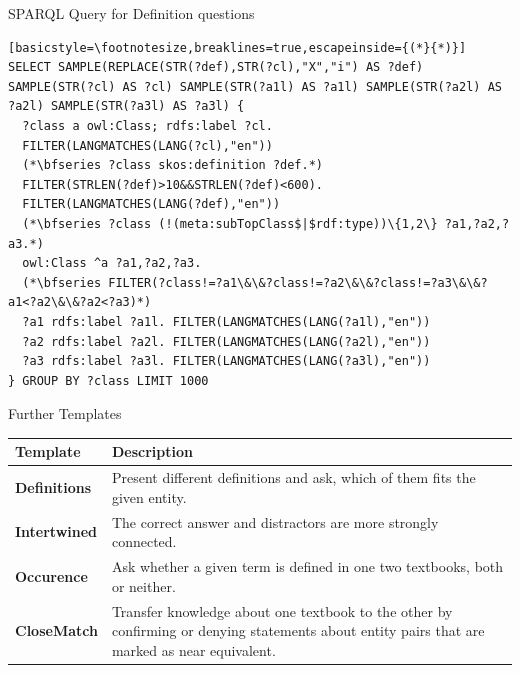 \documentclass[aspectratio=1610,12pt]{beamer}
\begin{document}
\begin{frame}[fragile]{SPARQL Query for Definition questions}
\begin{lstlisting}[basicstyle=\footnotesize,breaklines=true,escapeinside={(*}{*)}]
SELECT SAMPLE(REPLACE(STR(?def),STR(?cl),"X","i") AS ?def) SAMPLE(STR(?cl) AS ?cl) SAMPLE(STR(?a1l) AS ?a1l) SAMPLE(STR(?a2l) AS ?a2l) SAMPLE(STR(?a3l) AS ?a3l) {
  ?class a owl:Class; rdfs:label ?cl.
  FILTER(LANGMATCHES(LANG(?cl),"en"))
  (*\bfseries ?class skos:definition ?def.*)
  FILTER(STRLEN(?def)>10&&STRLEN(?def)<600).
  FILTER(LANGMATCHES(LANG(?def),"en"))
  (*\bfseries ?class (!(meta:subTopClass$|$rdf:type))\{1,2\} ?a1,?a2,?a3.*)
  owl:Class ^a ?a1,?a2,?a3.
  (*\bfseries FILTER(?class!=?a1\&\&?class!=?a2\&\&?class!=?a3\&\&?a1<?a2\&\&?a2<?a3)*)
  ?a1 rdfs:label ?a1l. FILTER(LANGMATCHES(LANG(?a1l),"en"))
  ?a2 rdfs:label ?a2l. FILTER(LANGMATCHES(LANG(?a2l),"en"))
  ?a3 rdfs:label ?a3l. FILTER(LANGMATCHES(LANG(?a3l),"en"))
} GROUP BY ?class LIMIT 1000
\end{lstlisting}
\end{frame}

\begin{frame}[fragile]{Further Templates}
\begin{tabulary}{\textwidth}{lL}
\toprule
\textbf{Template}		&\textbf{Description}\\
\midrule
\textbf{Definitions}	&Present different definitions and ask, which of them fits the given entity.\\
\textbf{Intertwined}	&The correct answer and distractors are more strongly connected.\\
\textbf{Occurence}		&Ask whether a given term is defined in one two textbooks, both or neither.\\
\textbf{CloseMatch}		&Transfer knowledge about one textbook to the other by confirming or denying statements about entity pairs that are marked as near equivalent.\\
\bottomrule
\end{tabulary}
\end{frame}
\end{document}
